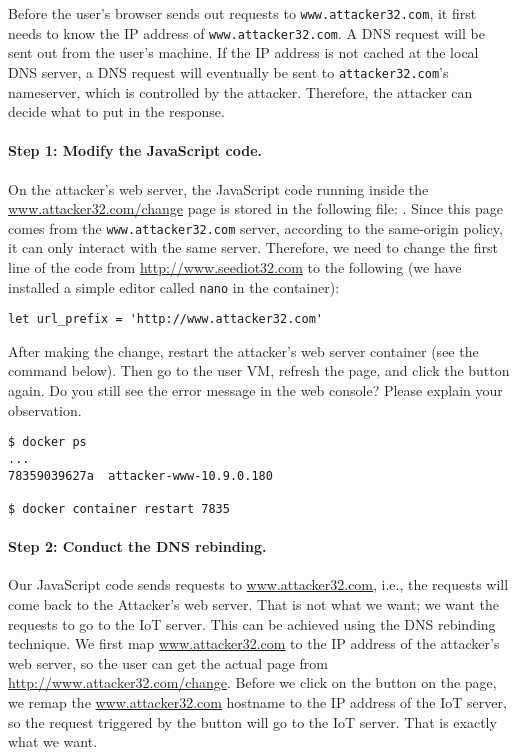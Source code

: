 Before the user's browser sends out requests to \texttt{www.attacker32.com},
it first needs to know the IP address of \texttt{www.attacker32.com}. 
A DNS request will be sent out from the user's machine. If the 
IP address is not cached at the local DNS server, a DNS request will
eventually be sent to \texttt{attacker32.com}'s  nameserver, which 
is controlled by the attacker. 
Therefore, the attacker can decide what to put in the response. 


\paragraph{Step 1: Modify the JavaScript code.}
On the attacker's web server, the JavaScript code running inside the 
\url{www.attacker32.com/change} page is 
stored in the following file: 
. Since this page
comes from the \texttt{www.attacker32.com} server, 
according to the same-origin policy, it can only
interact with the same server. Therefore, we need to change the first 
line of the code from \url{http://www.seediot32.com} 
to the following (we have installed a simple editor called \texttt{nano}
in the container):

\begin{lstlisting}
let url_prefix = 'http://www.attacker32.com'
\end{lstlisting}
 

After making the change, restart the attacker's web server container (see the 
command below). Then go to the user VM, refresh the page, and click the button again. 
Do you still see the error
message in the web console? Please explain your observation. 


\begin{lstlisting}
$ docker ps
...
78359039627a  attacker-www-10.9.0.180

$ docker container restart 7835
\end{lstlisting}
 


\paragraph{Step 2: Conduct the DNS rebinding.}
Our JavaScript code sends requests to \url{www.attacker32.com}, 
i.e., the requests will come back to the Attacker's web server. That is not 
what we want; we want the requests to go to the IoT server. 
This can be achieved using the DNS rebinding 
technique. We first map \url{www.attacker32.com} to the IP address of the attacker's
web server, so
the user can get the actual page from \url{http://www.attacker32.com/change}. 
Before we click on the button on the page, we remap
the \url{www.attacker32.com} hostname to the IP address of the IoT server, so
the request triggered by the button will go to the IoT server. That is exactly what 
we want. 


